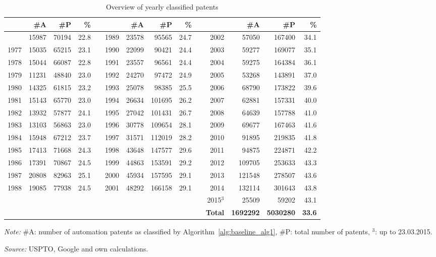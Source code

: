 \begin{table}[!htb]
\begin{small}
\begin{threeparttable}
\caption{{\normalsize Overview of yearly classified patents}}
\label{table:table_yearsstats}
\begin{tabular}{rrrrrrrrrrrrrr}
\toprule \addlinespace[0.5em]
 & \textbf{\#A} & \textbf{\#P} & \textbf{\%} & \phantom{aaa} & & \textbf{\#A} & \textbf{\#P} & \textbf{\%} & \phantom{aaa} & & \textbf{\#A} & \textbf{\#P} & \textbf{\%}\tabularnewline[0.1cm]
\midrule \addlinespace[0.5em]
1976 & 15987 & 70194 & 22.8 & & 1989 & 23578 & 95565 & 24.7 & & 2002 & 57050 & 167400 & 34.1 \tabularnewline[0.1cm]
1977 & 15035 & 65215 & 23.1 & & 1990 & 22099 & 90421 & 24.4 & & 2003 & 59277 & 169077 & 35.1 \tabularnewline[0.1cm]
1978 & 15044 & 66087 & 22.8 & & 1991 & 23557 & 96561 & 24.4 & & 2004 & 59275 & 164384 & 36.1 \tabularnewline[0.1cm]
1979 & 11231 & 48840 & 23.0 & & 1992 & 24270 & 97472 & 24.9 & & 2005 & 53268 & 143891 & 37.0 \tabularnewline[0.1cm]
1980 & 14325 & 61815 & 23.2 & & 1993 & 25078 & 98385 & 25.5 & & 2006 & 68790 & 173822 & 39.6 \tabularnewline[0.1cm]
1981 & 15143 & 65770 & 23.0 & & 1994 & 26634 & 101695 & 26.2 & & 2007 & 62881 & 157331 & 40.0 \tabularnewline[0.1cm]
1982 & 13932 & 57877 & 24.1 & & 1995 & 27042 & 101431 & 26.7 & & 2008 & 64639 & 157788 & 41.0 \tabularnewline[0.1cm]
1983 & 13103 & 56863 & 23.0 & & 1996 & 30778 & 109654 & 28.1 & & 2009 & 69677 & 167463 & 41.6 \tabularnewline[0.1cm]
1984 & 15948 & 67212 & 23.7 & & 1997 & 31571 & 112019 & 28.2 & & 2010 & 91895 & 219835 & 41.8 \tabularnewline[0.1cm]
1985 & 17413 & 71668 & 24.3 & & 1998 & 43648 & 147577 & 29.6 & & 2011 & 94875 & 224871 & 42.2 \tabularnewline[0.1cm]
1986 & 17391 & 70867 & 24.5 & & 1999 & 44863 & 153591 & 29.2 & & 2012 & 109705 & 253633 & 43.3 \tabularnewline[0.1cm]
1987 & 20808 & 82963 & 25.1 & & 2000 & 45934 & 157595 & 29.1 & & 2013 & 121548 & 278507 & 43.6 \tabularnewline[0.1cm]
1988 & 19085 & 77938 & 24.5 & & 2001 & 48292 & 166158 & 29.1 & & 2014 & 132114 & 301643 & 43.8 \tabularnewline[0.1cm]
& & & & & & & & & & 2015$^3$ & 25509 & 59202 & 43.1  \tabularnewline[0.1cm]
& & & & & & & & & & \textbf{Total} & \textbf{1692292} & \textbf{5030280} & \textbf{33.6} \tabularnewline[0.1cm]
\bottomrule\end{tabular}
\begin{tablenotes}
\small
\item\textit{Note:} \#A: number of automation patents as classified by Algorithm~\ref{alg:baseline_alg1}, \#P: total number of patents, $^3$: up to 23.03.2015.
\item\textit{Source:} USPTO, Google and own calculations.
\end{tablenotes}
\end{threeparttable}
\end{small}
\end{table}
